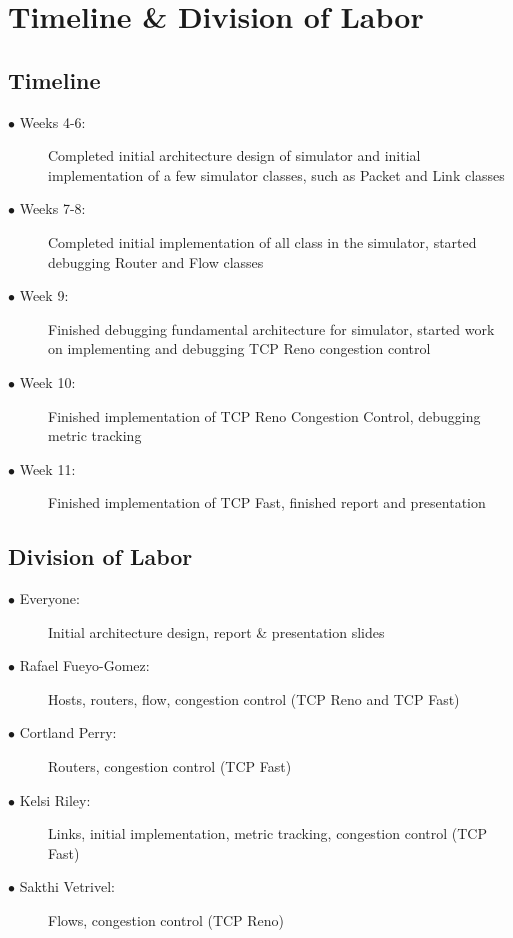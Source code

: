 \documentclass{article}
\begin{document}
\section{Timeline \& Division of Labor}

\subsection{Timeline}

\begin{description}
  \item[$\bullet$ Weeks 4-6:] Completed initial architecture design of simulator and initial implementation of a few simulator classes, such as Packet and Link classes
  \item[$\bullet$ Weeks 7-8:] Completed initial implementation of all class in the simulator, started debugging Router and Flow classes 
  \item[$\bullet$ Week 9:] Finished debugging fundamental architecture for simulator, started work on implementing and debugging TCP Reno congestion control
  \item[$\bullet$ Week 10:] Finished implementation of TCP Reno Congestion Control, debugging metric tracking
  \item[$\bullet$ Week 11:] Finished implementation of TCP Fast, finished report and presentation
\end{description}

\subsection{Division of Labor}

\begin{description}
    \item[$\bullet$ Everyone:] Initial architecture design, report \& presentation slides
	\item[$\bullet$ Rafael Fueyo-Gomez:] Hosts, routers, flow, congestion control (TCP Reno and TCP Fast)
	\item[$\bullet$ Cortland Perry:] Routers, congestion control (TCP Fast)
	\item[$\bullet$ Kelsi Riley:] Links, initial implementation, metric tracking, congestion control (TCP Fast)
	\item[$\bullet$ Sakthi Vetrivel:] Flows, congestion control (TCP Reno) 
\end{description}
\end{document}
